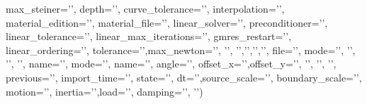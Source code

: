 {{{      max_steiner='',
      depth='',
      curve_tolerance='',
      interpolation='',
      material_edition='',
      material_file='',
      linear_solver='',
      preconditioner='',
      linear_tolerance='',
      linear_max_iterations='',
      gmres_restart='',
      linear_ordering='',
      tolerance='',max_newton=''},
      '\luaescapestring{\luafemm@roottransform}',
      {'\the\pgf@xx','\the\pgf@xy','\the\pgf@yx','\the\pgf@yy'},
      {file='',
       mode=''},
      '',
      '\luaescapestring{\luafemm@explicitproblem}',
      '',
      {name='',
       mode=''},
      {name='',
       angle='\luaescapestring{\luafemm@rotorangle}',
       offset_x='\luaescapestring{\luafemm@rotoroffsetx}',offset_y='\luaescapestring{\luafemm@rotoroffsety}'},
      '',
      '',
      '',{
        previous='',
        import_time='\luaescapestring{\luafemm@importtime}',
        state='',
        dt='\luaescapestring{\luafemm@timedt}',source_scale='\luaescapestring{\luafemm@timesource}',
        boundary_scale='\luaescapestring{\luafemm@timeboundary}',
        motion='',
        inertia='\luaescapestring{\luafemm@timeinertia}',load='\luaescapestring{\luafemm@timeload}',
        damping='\luaescapestring{\luafemm@timedamping}'},
      '')}%
  \luafemm@modelstartedtrue
  \luafemm@pendingexcitations
  \let\luafemm@pendingexcitations\pgfutil@empty
  \luafemm@pendingboundaries
  \let\luafemm@pendingboundaries\pgfutil@empty
  \fi
}
